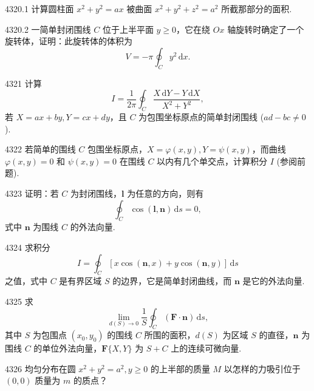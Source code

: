 \begin{prob}[M]{4320.1}
计算圆柱面 $x^2 + y^2 = ax$ 被曲面 $x^2 + y^2 + z^2 = a^2$ 所截那部分的面积.
\end{prob}

\begin{prob}[M]{4320.2}
一简单封闭围线 $C$ 位于上半平面 $y \geqslant 0$，它在绕 $Ox$ 轴旋转时确定了一个旋转体，证明：此旋转体的体积为
\[
V = -\pi \oint_C y^2\,\mathrm{d}x.
\]
\end{prob}

\begin{prob}[M]{4321}
计算
\[
I = \frac{1}{2\pi} \oint_C \frac{X\,\mathrm{d}Y - Y\,\mathrm{d}X}{X^2 + Y^2},
\]
若 $X = ax + by, Y = cx + dy$，且 $C$ 为包围坐标原点的简单封闭围线 ($ad - bc \neq 0$).
\end{prob}

\begin{prob}[M]{4322}
若简单的围线 $C$ 包围坐标原点，$X = \varphi(x,y), Y = \psi(x,y)$，而曲线 $\varphi(x,y) = 0$ 和 $\psi(x,y) = 0$ 在围线 $C$ 以内有几个单交点，计算积分 $I$ (参阅前题).
\end{prob}

\begin{prob}[M]{4323}
证明：若 $C$ 为封闭围线，$\boldsymbol{l}$ 为任意的方向，则有
\[
\oint_C \cos(\boldsymbol{l}, \boldsymbol{n})\,\mathrm{d}s = 0,
\]
式中 $\boldsymbol{n}$ 为围线 $C$ 的外法向量.
\end{prob}

\begin{prob}[M]{4324}
求积分
\[
I = \oint_C [x\cos(\boldsymbol{n}, x) + y\cos(\boldsymbol{n}, y)]\,\mathrm{d}s
\]
之值，式中 $C$ 是有界区域 $S$ 的边界，它是简单封闭曲线，而 $\boldsymbol{n}$ 是它的外法向量.
\end{prob}

\begin{prob}[M]{4325}
求
\[
\lim_{d(S) \to 0} \frac{1}{S} \oint_C (\boldsymbol{F} \cdot \boldsymbol{n})\,\mathrm{d}s,
\]
其中 $S$ 为包围点 $(x_0, y_0)$ 的围线 $C$ 所围的面积，$d(S)$ 为区域 $S$ 的直径，$\boldsymbol{n}$ 为围线 $C$ 的单位外法向量，$\boldsymbol{F}\{X, Y\}$ 为 $S + C$ 上的连续可微向量.
\end{prob}


\begin{prob}[M]{4326}
均匀分布在圆 $x^2 + y^2 = a^2, y \geqslant 0$ 的上半部的质量 $M$ 以怎样的力吸引位于 $(0,0)$ 质量为 $m$ 的质点？
\end{prob}

